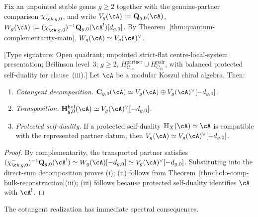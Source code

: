 Fix an unpointed stable genus $g \geq 2$ together with the
genuine-partner comparison \(\chi^-_{\cA;g,0}\), and write
$V_g(\cA) := \mathbf{Q}_{g,0}(\cA)$,
$W_g(\cA) :=
(\chi^-_{\cA;g,0})^{-1}\mathbf{Q}_{g,0}(\cA^!)[d_{g,0}]$.
By Theorem~\ref{thm:quantum-complementarity-main},
$W_g(\cA) \simeq V_g(\cA)^\vee$.

\begin{theorem}
\label{thm:holo-comp-cotangent-realization}
\textup{[Type signature: Open quadrant; unpointed strict-flat
centre-local-system presentation; Beilinson level~3; \(g\geq2\),
\(H_{\mathrm C_{1a}}^{\mathrm{partner}}\cup
H_{\mathrm C_{1b}}^{\mathrm{pair}}\), with balanced protected
self-duality for clause~\textup{(iii)}.]}
Let $\cA$ be a modular Koszul chiral algebra. Then:
\begin{enumerate}[label=\textup{(\roman*)}]
\item \emph{Cotangent decomposition.}\;
 $\mathbf{C}_{g,0}(\cA) \simeq V_g(\cA) \oplus V_g(\cA)^\vee[-d_{g,0}]$.
\item \emph{Transposition.}\;
 $\mathbf{H}^{\mathrm{hol}}_{g,0}(\cA) \simeq V_g(\cA)^\vee[-d_{g,0}]$.
\item \emph{Protected self-duality.}\;
 If a protected self-duality $\mathbb{H}_X(\cA)\simeq\cA$ is
 compatible with the represented partner datum, then
 $V_g(\cA) \simeq V_g(\cA)^\vee[-d_{g,0}]$.
\end{enumerate}
\end{theorem}

\begin{proof}
By complementarity, the transported partner satisfies
$(\chi^-_{\cA;g,0})^{-1}\mathbf{Q}_{g,0}(\cA^!)
\simeq W_g(\cA)[-d_{g,0}]
\simeq V_g(\cA)^\vee[-d_{g,0}]$. Substituting into the direct-sum
decomposition proves (i); (ii) follows from
Theorem~\ref{thm:holo-comp-bulk-reconstruction}(iii);
(iii) follows because protected self-duality identifies $\cA$ with
$\cA^!$.
\end{proof}

The cotangent realization has immediate spectral consequences.


